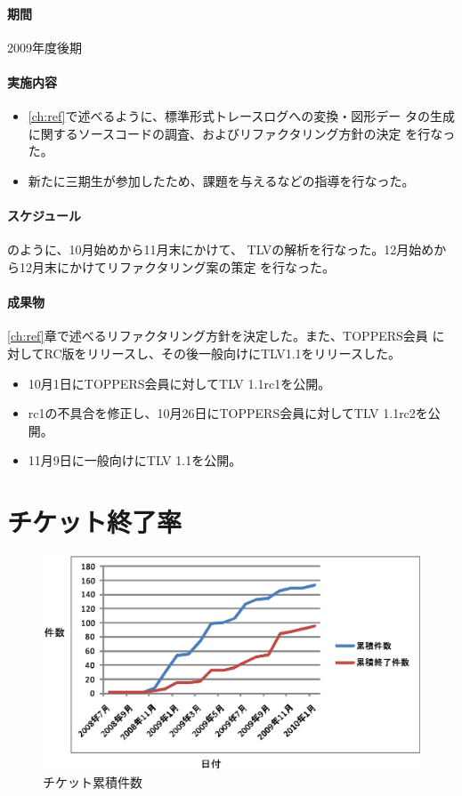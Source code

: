 \paragraph{期間} 2009年度後期

\paragraph{実施内容}
\begin{itemize}
\item \ref{ch:ref}で述べるように、標準形式トレースログへの変換・図形デー
  タの生成に関するソースコードの調査、およびリファクタリング方針の決定
  を行なった。
\item 新たに三期生が参加したため、課題を与えるなどの指導を行なった。
\end{itemize}

\paragraph{スケジュール} のように、10月始めから11月末にかけて、
TLVの解析を行なった。12月始めから12月末にかけてリファクタリング案の策定
を行なった。

\paragraph{成果物}
\ref{ch:ref}章で述べるリファクタリング方針を決定した。また、TOPPERS会員
に対してRC版をリリースし、その後一般向けにTLV1.1をリリースした。

\begin{itemize}
\item 10月1日にTOPPERS会員に対してTLV 1.1rc1を公開。
\item rc1の不具合を修正し、10月26日にTOPPERS会員に対してTLV 1.1rc2を公開。
\item 11月9日に一般向けにTLV 1.1を公開。
\end{itemize}

\section{チケット終了率}
\begin{figure}
\centering
\includegraphics[width=\textwidth]{ticket.eps}
\caption{チケット累積件数}\label{ticket}
\end{figure}

